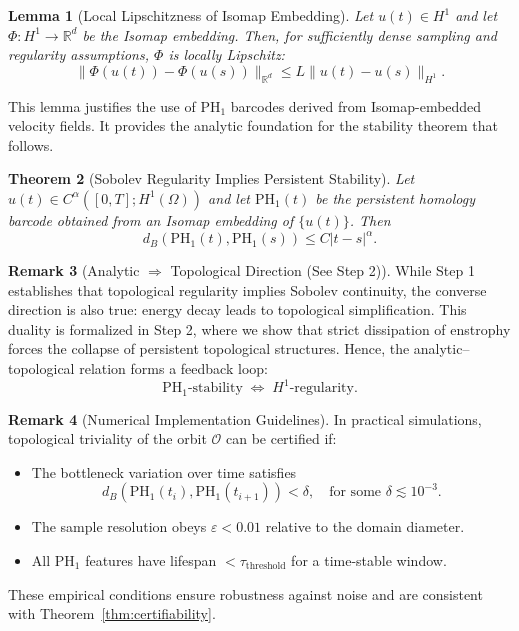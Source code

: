 \documentclass[11pt]{article}
\newtheorem{theorem}{Theorem}[section]
\newtheorem{lemma}[theorem]{Lemma}
\theoremstyle{definition}
\newtheorem{remark}[theorem]{Remark}
\begin{document}
\begin{lemma}[Local Lipschitzness of Isomap Embedding]
Let $u(t) \in H^1$ and let $\Phi: H^1 \to \mathbb{R}^d$ be the Isomap embedding. Then, for sufficiently dense sampling and regularity assumptions, $\Phi$ is locally Lipschitz:
\[
\|\Phi(u(t)) - \Phi(u(s))\|_{\mathbb{R}^d} \leq L \|u(t) - u(s)\|_{H^1}.
\]
\end{lemma}

This lemma justifies the use of $\mathrm{PH}_1$ barcodes derived from Isomap-embedded velocity fields. It provides the analytic foundation for the stability theorem that follows.

\begin{theorem}[Sobolev Regularity Implies Persistent Stability]
Let $u(t) \in C^\alpha([0,T]; H^1(\Omega))$ and let $\mathrm{PH}_1(t)$ be the persistent homology barcode obtained from an Isomap embedding of $\{u(t)\}$. Then
\[
d_B(\mathrm{PH}_1(t), \mathrm{PH}_1(s)) \leq C |t - s|^\alpha.
\]
\end{theorem}

\begin{remark}[Analytic $\Rightarrow$ Topological Direction (See Step 2)]
While Step 1 establishes that topological regularity implies Sobolev continuity, the converse direction is also true: energy decay leads to topological simplification. This duality is formalized in Step 2, where we show that strict dissipation of enstrophy forces the collapse of persistent topological structures. Hence, the analytic–topological relation forms a feedback loop:
\[
\mathrm{PH}_1\text{-stability} \;\Longleftrightarrow\; H^1\text{-regularity}.
\]
\end{remark}

\begin{remark}[Numerical Implementation Guidelines]
In practical simulations, topological triviality of the orbit $\mathcal{O}$ can be certified if:
\begin{itemize}
    \item The bottleneck variation over time satisfies
    \[
    d_B(\mathrm{PH}_1(t_i), \mathrm{PH}_1(t_{i+1})) < \delta, \quad \text{for some } \delta \lesssim 10^{-3}.
    \]
    \item The sample resolution obeys $\varepsilon < 0.01$ relative to the domain diameter.
    \item All $\mathrm{PH}_1$ features have lifespan $< \tau_\text{threshold}$ for a time-stable window.
\end{itemize}
These empirical conditions ensure robustness against noise and are consistent with Theorem~\ref{thm:certifiability}.
\end{remark}
\end{document}
